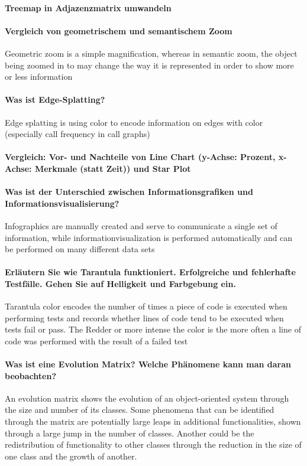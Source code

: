 \documentclass[10pt,a4paper]{article}
\begin{document}
	\paragraph{Treemap in Adjazenzmatrix umwandeln}

	\paragraph{Vergleich von geometrischem und semantischem Zoom}
	Geometric zoom is a simple magnification, whereas in semantic zoom, the object being zoomed in to may change the way it is represented in order to show more or less information

	\paragraph{Was ist Edge-Splatting?}
	Edge splatting is using color to encode information on edges with color (especially call frequency in call graphs)

	\paragraph{Vergleich: Vor- und Nachteile von Line Chart (y-Achse: Prozent, x-Achse: Merkmale (statt Zeit)) und Star Plot}
	
	\paragraph{Was ist der Unterschied zwischen Informationsgrafiken und Informationsvisualisierung?}
	Infographics are manually created and serve to communicate a single set of information, while informationvisualization is performed automatically and can be performed on many different data sets
	
	\paragraph{Erläutern Sie wie Tarantula funktioniert. Erfolgreiche und fehlerhafte Testfälle. Gehen Sie auf Helligkeit und Farbgebung ein.}
	Tarantula color encodes the number of times a piece of code is executed when performing tests and records whether lines of code tend to be executed when tests fail or pass. The Redder or more intense the color is the more often a line of code was performed with the result of a failed test 
	
	\paragraph{Was ist eine Evolution Matrix? Welche Phänomene kann man daran beobachten?}
	An evolution matrix shows the evolution of an object-oriented system through the size and number of its classes. Some phenomena that can be identified through the matrix are potentially large leaps in additional functionalities, shown through a large jump in the number of classes. Another could be the redistribution of functionality to other classes through the reduction in the size of one class and the growth of another.
	
\end{document}
